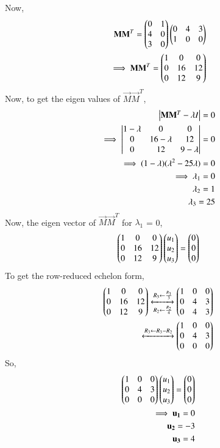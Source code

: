 \documentclass[journal,12pt,twocolumn]{IEEEtran}
\begin{document}
Now,
\begin{align}
\mathbf{M} \mathbf{M}^T= \begin{pmatrix}0 & 1\\4 & 0\\3 & 0\end{pmatrix}\begin{pmatrix}0& 4& 3\\1 & 0 & 0\end{pmatrix} \\
\implies \mathbf{M} \mathbf{M}^T = \begin{pmatrix}1 & 0 & 0\\0 & 16 & 12\\0 & 12 & 9\end{pmatrix}
\end{align}
Now, to get the eigen values of $\vec{M}\vec{M}^T$,
\begin{align}
\begin{vmatrix}\mathbf{M}\mathbf{M}^T  - \lambda I\end{vmatrix} = 0\\
\implies \begin{vmatrix}1-\lambda & 0 & 0\\0 & 16-\lambda & 12\\0 & 12 & 9-\lambda\end{vmatrix} = 0\\
\implies (1-\lambda)(\lambda^2 - 25\lambda)=0\\
\implies \lambda_1 = 0\\
\lambda_2 = 1\\
\lambda_3 = 25
\end{align}
Now, the eigen vector of $\vec{M}\vec{M}^T $ for $\lambda_1$ = 0,
\begin{align}
\begin{pmatrix}1 & 0 & 0\\0 & 16 &12\\0 & 12 & 9\end{pmatrix} \begin{pmatrix}u_1\\u_2\\u_3\end{pmatrix} = \begin{pmatrix}0\\0\\0\end{pmatrix}\\
\end{align}
To get the row-reduced echelon form,
\begin{align}
\begin{pmatrix}1 & 0 & 0\\0 & 16 &12\\0 &12&9\end{pmatrix} \xleftrightarrow[R_2\leftarrow\frac{R_2}{4}]{R_3\leftarrow \frac{R_3}{3}} \begin{pmatrix}1 & 0 & 0\\0 & 4 &3\\0 &4&3\end{pmatrix}\\
\xleftrightarrow[]{R_3\leftarrow R_3-R_2}\begin{pmatrix}1 & 0 & 0\\0 & 4 &3\\0 &0&0\end{pmatrix}
\end{align}
So,
\begin{align}
\begin{pmatrix}1 & 0 & 0\\0 & 4 &3\\0 &0&0\end{pmatrix}\begin{pmatrix}u_1\\u_2\\u_3\end{pmatrix} = \begin{pmatrix}0\\0\\0\end{pmatrix}\\
\implies \mathbf{u_1}=0\\
\mathbf{u_2}=-3\\
\mathbf{u_3}=4
\end{align}
\end{document}
